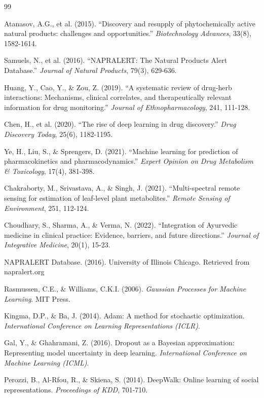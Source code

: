 \documentclass[11pt,a4paper]{article}
\begin{document}
\begin{thebibliography}{99}

Atanasov, A.G., et al. (2015). ``Discovery and resupply of phytochemically active natural products: challenges and opportunities.'' \textit{Biotechnology Advances}, 33(8), 1582-1614.

Samuels, N., et al. (2016). ``NAPRALERT: The Natural Products Alert Database.'' \textit{Journal of Natural Products}, 79(3), 629-636.

Huang, Y., Cao, Y., \& Zou, Z. (2019). ``A systematic review of drug-herb interactions: Mechanisms, clinical correlates, and therapeutically relevant information for drug monitoring.'' \textit{Journal of Ethnopharmacology}, 241, 111-128.

Chen, H., et al. (2020). ``The rise of deep learning in drug discovery.'' \textit{Drug Discovery Today}, 25(6), 1182-1195.

Ye, H., Liu, S., \& Sprengers, D. (2021). ``Machine learning for prediction of pharmacokinetics and pharmacodynamics.'' \textit{Expert Opinion on Drug Metabolism \& Toxicology}, 17(4), 381-398.

Chakraborty, M., Srivastava, A., \& Singh, J. (2021). ``Multi-spectral remote sensing for estimation of leaf-level plant metabolites.'' \textit{Remote Sensing of Environment}, 251, 112-124.

Choudhary, S., Sharma, A., \& Verma, N. (2022). ``Integration of Ayurvedic medicine in clinical practice: Evidence, barriers, and future directions.'' \textit{Journal of Integrative Medicine}, 20(1), 15-23.

NAPRALERT Database. (2016). University of Illinois Chicago. Retrieved from napralert.org

Rasmussen, C.E., \& Williams, C.K.I. (2006). \textit{Gaussian Processes for Machine Learning}. MIT Press.

Kingma, D.P., \& Ba, J. (2014). Adam: A method for stochastic optimization. \textit{International Conference on Learning Representations (ICLR)}.

Gal, Y., \& Ghahramani, Z. (2016). Dropout as a Bayesian approximation: Representing model uncertainty in deep learning. \textit{International Conference on Machine Learning (ICML)}.

Perozzi, B., Al-Rfou, R., \& Skiena, S. (2014). DeepWalk: Online learning of social representations. \textit{Proceedings of KDD}, 701-710.


\end{thebibliography}
\end{document}
